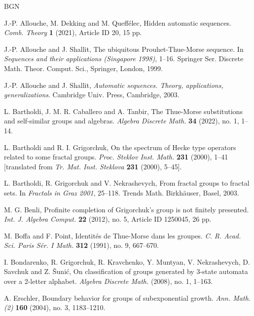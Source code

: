 \documentclass[12pt]{article}
\theoremstyle{definition}
\begin{document}
%
\begin{thebibliography}{BGN}

J.-P. Allouche, M. Dekking and M. Queff{\'e}lec, Hidden automatic 
sequences. \emph{Comb. Theory} \textbf{1} (2021), Article ID 20, 15 pp.

J.-P. Allouche and J. Shallit, The ubiquitous Prouhet-Thue-Morse sequence.  
In \emph{Sequences and their applications (Singapore 1998)}, 1--16.  
Springer Ser. Discrete Math. Theor. Comput. Sci., Springer, London, 1999.

J.-P. Allouche and J. Shallit, \emph{Automatic sequences.  Theory, 
applications, generalizations}.  Cambridge Univ. Press, Cambridge, 2003.

L. Bartholdi, J. M. R. Caballero and A. Tanbir, The Thue-Morse 
substitutions and self-similar groups and algebras. \emph{Algebra Discrete 
Math.} \textbf{34} (2022), no. 1, 1--14.

L. Bartholdi and R. I. Grigorchuk, On the spectrum of Hecke type operators 
related to some fractal groups. \emph{Proc. Steklov Inst. Math.} 
\textbf{231} (2000), 1--41 [translated from \emph{Tr. Mat. Inst. Steklova} 
\textbf{231} (2000), 5--45].

L. Bartholdi, R. Grigorchuk and V. Nekrashevych, From fractal groups to 
fractal sets. In \emph{Fractals in Graz 2001}, 25--118. Trends Math. 
Birkh\"{a}user, Basel, 2003.

M. G. Benli, Profinite completion of Grigorchuk's group is not finitely 
presented. \emph{Int. J. Algebra Comput.} \textbf{22} (2012), no. 5, 
Article ID 1250045, 26 pp.

M. Boffa and F. Point, Identit\'{e}s de Thue-Morse dans les groupes. 
\emph{C. R. Acad. Sci. Paris S\'{e}r. I Math.} \textbf{312} (1991), no. 9, 
667--670.

I. Bondarenko, R. Grigorchuk, R. Kravchenko, Y. Muntyan, V. Nekrashevych, 
D. Savchuk and Z. \v{S}uni{\'c}, On classification of groups generated by 
3-state automata over a 2-letter alphabet. \emph{Algebra Discrete Math.} 
(2008), no. 1, 1--163.

A. Erschler, Boundary behavior for groups of subexponential growth. 
\emph{Ann. Math. (2)} \textbf{160} (2004), no. 3, 1183--1210.


\end{thebibliography}
\end{document}
